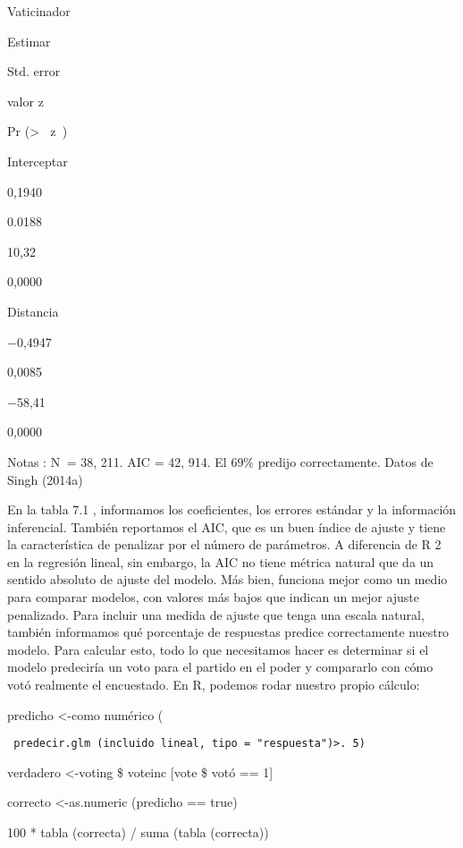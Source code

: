 \documentclass[
]{book}
\begin{document}
Vaticinador

Estimar

Std. error

valor z

Pr (\textgreater{} \textbar{}  z  \textbar)

Interceptar

0,1940

0.0188

10,32

0,0000

Distancia

−0,4947

0,0085

−58,41

0,0000

Notas : N  = 38, 211. AIC = 42, 914. El 69\% predijo correctamente. Datos de Singh (2014a)

En la tabla 7.1 , informamos los coeficientes, los errores estándar y la información inferencial. También reportamos el AIC, que es un buen índice de ajuste y tiene la característica de penalizar por el número de parámetros. A diferencia de R 2 en la regresión lineal, sin embargo, la AIC no tiene métrica natural que da un sentido absoluto de ajuste del modelo. Más bien, funciona mejor como un medio para comparar modelos, con valores más bajos que indican un mejor ajuste penalizado. Para incluir una medida de ajuste que tenga una escala natural, también informamos qué porcentaje de respuestas predice correctamente nuestro modelo. Para calcular esto, todo lo que necesitamos hacer es determinar si el modelo predeciría un voto para el partido en el poder y compararlo con cómo votó realmente el encuestado. En R, podemos rodar nuestro propio cálculo:

predicho \textless-como numérico (

\begin{verbatim}
 predecir.glm (incluido lineal, tipo = "respuesta")>. 5)
\end{verbatim}

verdadero \textless-voting \$ voteinc {[}vote \$ votó == 1{]}

correcto \textless-as.numeric (predicho == true)

100 * tabla (correcta) / suma (tabla (correcta))
\end{document}
